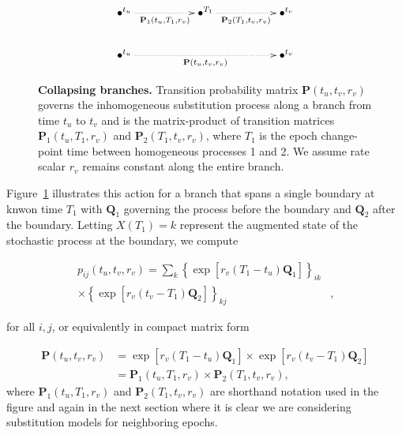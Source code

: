 \begin{figure}[h!]
\centering
\begingroup
\everymath{\displaystyle}
{\Large
\begin{displaymath} %
    \xymatrix{ 
    \bullet^{t_u} \ar@{.>}[rr]_{\mathbf{P}_{1}(t_{u},T_{1},r_v)} && \bullet^{T_1} \ar@{.>}[rr]_{\mathbf{P}_{2}(T_{1},t_{v},r_v)} && \bullet^{t_v} \\
    \bullet^{t_u} \ar@{.>}[rrrr]_{\mathbf{P}(t_{u},t_{v},r_v)} & & & & \bullet^{t_v}
    } %
\end{displaymath}
}
\endgroup
\caption{
{ \footnotesize 
{\bf Collapsing branches.} Transition probability matrix $\mathbf{P}(t_u,t_v,r_v)$ governs the inhomogeneous substitution process along a branch from time $t_u$ to $t_v$ and is the matrix-product of transition matrices $\mathbf{P}_{1}(t_u,T_1,r_v)$ and $\mathbf{P}_{2}(T_1,t_v,r_v)$, where $T_1$ is the epoch change-point time between homogeneous processes 1 and 2.  We assume rate scalar $r_v$ remains constant along the entire branch.
} %
}
\label{fig:collapsing}
\end{figure}

Figure~\ref{fig:collapsing} illustrates this action for a branch that spans a single boundary at knwon time $T_1$ with $\mathbf{Q}_1$ governing the process before the boundary and $\mathbf{Q}_2$ after the boundary. Letting $X(T_1) = k$ represent the augmented state of the stochastic process at the boundary, we compute

\begin{align}
p_{ij}(t_u, t_v, r_v)
= \sum_{k} 
\left\{
\exp[ r_v ( T_1 - t_u ) \mathbf{Q}_1]
\right\}_{ik} & \nonumber \\
\times 
\left\{
\exp[ r_v ( t_v - T_1 ) \mathbf{Q}_2]
\right\}_{kj} & , 
\end{align}

\noindent
for all $i,j$, or equivalently in compact matrix form

\begin{align}
\mathbf{P}(t_u, t_v, r_v)
&= 
\exp[ r_v ( T_1 - t_u ) \mathbf{Q}_1]
\times
\exp[ r_v ( t_v - T_1 ) \mathbf{Q}_2] \nonumber \\
&= \mathbf{P}_{1}(t_u, T_1, r_v) \times \mathbf{P}_{2}(T_1, t_v, r_v) ,
\label{matrixProduct}
\end{align}
where 
$\mathbf{P}_{1}(t_u, T_1, r_v)$ and $\mathbf{P}_{2}(T_1, t_v, r_v)$ are shorthand notation used in the figure and again in the next section where it is clear we are considering substitution models for neighboring epochs.

